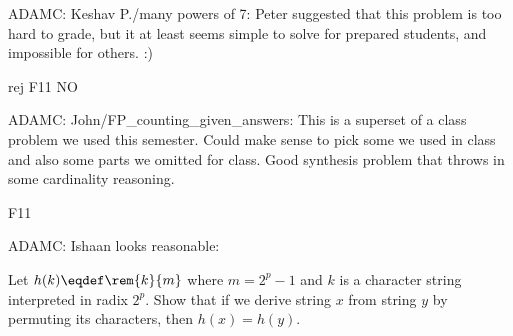 \documentclass[quiz]{mcs}
\begin{document}

\begin{editingnotes}
ADAMC: Keshav P./many powers of 7: Peter suggested that this problem is too
hard to grade, but it at least seems simple to solve for prepared
students, and impossible for others. :)
\end{editingnotes}


\begin{editingnotes}rej F11 NO

ADAMC: John/FP\_counting\_given\_answers: This is a superset of a class
problem we used this semester.  Could make sense to pick some we used
in class and also some parts we omitted for class.  Good synthesis
problem that throws in some cardinality reasoning.
\end{editingnotes}


\begin{editingnotes}F11

ADAMC: Ishaan looks reasonable:

Let $h(k) \eqdef \rem{k}{m}$ where $m = 2^p - 1$ and $k$ is a
character string interpreted in radix $2^p$.  Show that if we derive
string $x$ from string $y$ by permuting its characters, then $h(x) =
h(y)$.\
\end{editingnotes}



\end{document}
